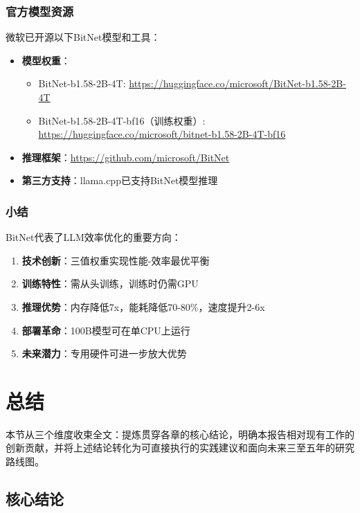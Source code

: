 \documentclass[12pt,a4paper]{article}
\begin{document}
\subsubsection{官方模型资源}

微软已开源以下BitNet模型和工具：

\begin{itemize}
    \item \textbf{模型权重}：
    \begin{itemize}
        \item BitNet-b1.58-2B-4T: \url{https://huggingface.co/microsoft/BitNet-b1.58-2B-4T}
        \item BitNet-b1.58-2B-4T-bf16（训练权重）: \url{https://huggingface.co/microsoft/bitnet-b1.58-2B-4T-bf16}
    \end{itemize}
    \item \textbf{推理框架}：\url{https://github.com/microsoft/BitNet}
    \item \textbf{第三方支持}：llama.cpp已支持BitNet模型推理
\end{itemize}

\subsubsection{小结}

BitNet代表了LLM效率优化的重要方向：

\begin{enumerate}
    \item \textbf{技术创新}：三值权重实现性能-效率最优平衡
    \item \textbf{训练特性}：需从头训练，训练时仍需GPU
    \item \textbf{推理优势}：内存降低7x，能耗降低70-80\%，速度提升2-6x
    \item \textbf{部署革命}：100B模型可在单CPU上运行
    \item \textbf{未来潜力}：专用硬件可进一步放大优势
\end{enumerate}

\section{总结}

本节从三个维度收束全文：提炼贯穿各章的核心结论，明确本报告相对现有工作的创新贡献，并将上述结论转化为可直接执行的实践建议和面向未来三至五年的研究路线图。

\subsection{核心结论}
\end{document}
